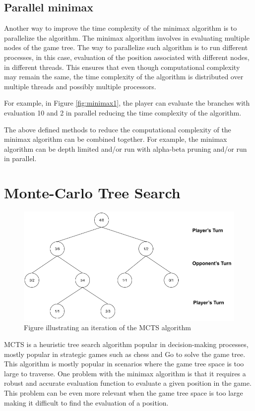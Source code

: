 \subsection{Parallel minimax}
Another way to improve the time complexity of the minimax algorithm is to parallelize the algorithm. The minimax algorithm involves in evaluating multiple nodes of the game tree. The way to parallelize such algorithm is to run different processes, in this case, evaluation of the position associated with different nodes, in different threads. This ensures that even though computational complexity may remain the same, the time complexity of the algorithm is distributed over multiple threads and possibly multiple processors.

For example, in Figure \ref{fig:minimax1}, the player can evaluate the branches with evaluation 10 and 2 in parallel reducing the time complexity of the algorithm.


The above defined methods to reduce the computational complexity of the minimax algorithm can be combined together. For example, the minimax algorithm can be depth limited and/or run with alpha-beta pruning and/or run in parallel.

\section{Monte-Carlo Tree Search}

\begin{figure}[!ht]
    \centering
    \includegraphics[width = \linewidth]{../img/MCTS1.png}
    \caption{Figure illustrating an iteration of the MCTS algorithm}
    \label{fig:MCTS1}
\end{figure}

\gls{MCTS} \cite{Coulom2006Efficient} is a heuristic tree search algorithm popular in decision-making processes, mostly popular in strategic games such as chess and Go to solve the game tree. This algorithm is mostly popular in scenarios where the game tree space is too large to traverse. One problem with the minimax algorithm is that it requires a robust and accurate evaluation function to evaluate a given position in the game. This problem can be even more relevant when the game tree space is too large making it difficult to find the evaluation of a position.

